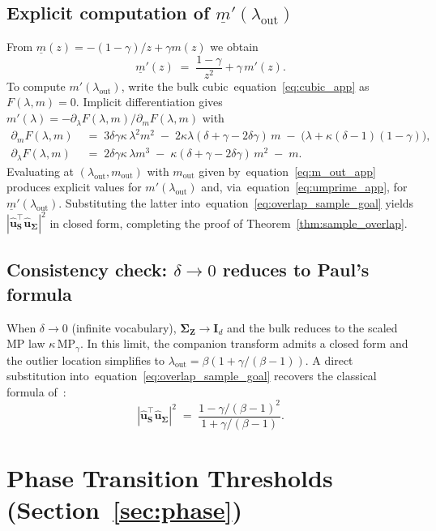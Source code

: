 \documentclass{article}
\def\eqref#1{equation~\ref{#1}}
\def\vu{{\bm{u}}}
\def\mI{{\bm{I}}}
\def\mS{{\bm{S}}}
\def\mZ{{\bm{Z}}}
\def\mSigma{{\bm{\Sigma}}}
\begin{document}
\subsection{Explicit computation of \texorpdfstring{$\underline{m}'(\lambda_\mathrm{out})$}{m'(lambda\_out)}}

From $\underline{m}(z)=-(1-\gamma)/z+\gamma m(z)$ we obtain
\begin{equation}\label{eq:umprime_app}
    \underline{m}'(z) \;=\; \frac{1-\gamma}{z^2} + \gamma\,m'(z).
\end{equation}
To compute $m'(\lambda_\mathrm{out})$, write the bulk cubic~\eqref{eq:cubic_app} as $F(\lambda,m)=0$. Implicit differentiation gives $m'(\lambda) = -\partial_\lambda F(\lambda,m)/\partial_m F(\lambda,m)$ with
\begin{align}
    \partial_m F(\lambda,m) &\;=\; 3\delta\gamma\kappa\,\lambda^2 m^2 \;-\; 2\kappa\lambda(\delta+\gamma-2\delta\gamma)\,m \;-\; \big(\lambda+\kappa(\delta-1)(1-\gamma)\big), \label{eq:Fm_app}\\
    \partial_\lambda F(\lambda,m) &\;=\; 2\delta\gamma\kappa\,\lambda m^3 \;-\; \kappa(\delta+\gamma-2\delta\gamma)\,m^2 \;-\; m. \label{eq:Fl_app}
\end{align}
Evaluating at $(\lambda_\mathrm{out},m_\mathrm{out})$ with $m_\mathrm{out}$ given by~\eqref{eq:m_out_app} produces explicit values for $m'(\lambda_\mathrm{out})$ and, via~\eqref{eq:umprime_app}, for $\underline{m}'(\lambda_\mathrm{out})$. Substituting the latter into~\eqref{eq:overlap_sample_goal} yields $|\hat\vu_\mS^\top\hat\vu_\mSigma|^2$ in closed form, completing the proof of Theorem~\ref{thm:sample_overlap}.

\subsection{Consistency check: \texorpdfstring{$\delta\to 0$}{delta -> 0} reduces to Paul's formula}

When $\delta\to 0$ (infinite vocabulary), $\mSigma_\mZ\to \mI_d$ and the bulk reduces to the scaled MP law $\kappa\,\mathrm{MP}_\gamma$. In this limit, the companion transform admits a closed form and the outlier location simplifies to $\lambda_\mathrm{out}=\beta(1+\gamma/(\beta-1))$. A direct substitution into~\eqref{eq:overlap_sample_goal} recovers the classical formula of~\citet{paul2007asymptotics}:
\[
    |\hat\vu_\mS^\top\hat\vu_\mSigma|^2 \;=\; \frac{1-\gamma/(\beta-1)^2}{1+\gamma/(\beta-1)}.
\]


\section{Phase Transition Thresholds (Section~\ref{sec:phase})}\label{app:phase}
\end{document}

